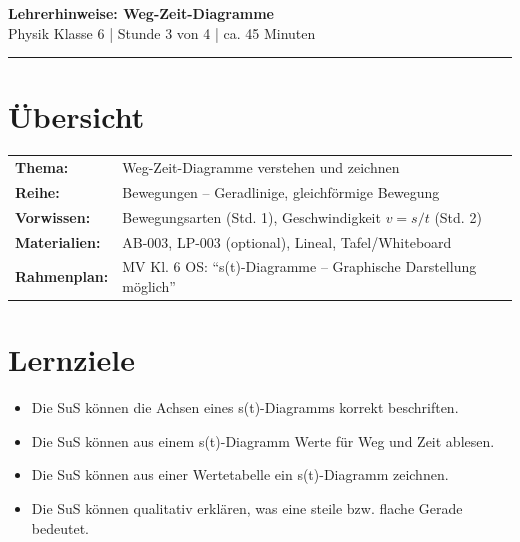 \documentclass[11pt,a4paper]{article}
\begin{document}
\begin{center}
    {\Large\bfseries\textcolor{physik}{Lehrerhinweise: Weg-Zeit-Diagramme}}\\[0.3em]
    {\normalsize Physik Klasse 6 | Stunde 3 von 4 | ca. 45 Minuten}
\end{center}

\vspace{0.5em}
\hrule
\vspace{1em}

\section*{Übersicht}

\begin{tabular}{ll}
    \textbf{Thema:} & Weg-Zeit-Diagramme verstehen und zeichnen \\
    \textbf{Reihe:} & Bewegungen -- Geradlinige, gleichförmige Bewegung \\
    \textbf{Vorwissen:} & Bewegungsarten (Std. 1), Geschwindigkeit $v = s/t$ (Std. 2) \\
    \textbf{Materialien:} & AB-003, LP-003 (optional), Lineal, Tafel/Whiteboard \\
    \textbf{Rahmenplan:} & MV Kl. 6 OS: ``s(t)-Diagramme -- Graphische Darstellung möglich''
\end{tabular}

\section*{Lernziele}

\begin{itemize}[leftmargin=2em]
    \item Die SuS können die Achsen eines s(t)-Diagramms korrekt beschriften.
    \item Die SuS können aus einem s(t)-Diagramm Werte für Weg und Zeit ablesen.
    \item Die SuS können aus einer Wertetabelle ein s(t)-Diagramm zeichnen.
    \item Die SuS können qualitativ erklären, was eine steile bzw. flache Gerade bedeutet.
\end{itemize}
\end{document}
